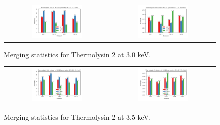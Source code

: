 \begin{figure}[h]
    \centering
    \begin{tabular}{cc}
    \includegraphics[width = 0.5\textwidth]{plots/exp1/tlys_2_P6122/3p0_I_over_sigma.png} & \includegraphics[width = 0.5\textwidth]{plots/exp1/tlys_2_P6122/3p0_rmerges.png}
    \end{tabular}
    \caption{Merging statistics for Thermolysin 2 at 3.0 keV.}
    \label{fig:tlys_2_3p0}
\end{figure}

\begin{figure}[h]
    \centering
    \begin{tabular}{cc}
    \includegraphics[width = 0.5\textwidth]{plots/exp1/tlys_2_P6122/3p5_I_over_sigma.png} & \includegraphics[width = 0.5\textwidth]{plots/exp1/tlys_2_P6122/3p5_rmerges.png}
    \end{tabular}
    \caption{Merging statistics for Thermolysin 2 at 3.5 keV.}
    \label{fig:tlys_2_3p5}
\end{figure}

